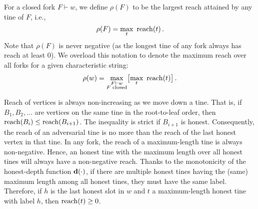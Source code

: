\begin{definition}
For a closed fork $F\vdash w$, we define $\rho(F)$ to be the largest reach attained by any tine of $F$, i.e., 
\[
\rho(F)=\underset{t}\max \ \reach(t)\,.
\]
Note that $\rho(F)$ is never negative (as the longest tine of any fork always has reach at least 0). We overload this notation to denote the maximum reach over all forks for a given characteristic string: 
\[
\rho(w)=\underset{\substack{F\vdash w\\\text{$F$ closed}}}\max\big[\underset{t}\max \ \operatorname{reach}(t)\big]\,.
\]
\end{definition}

Reach of vertices is always non-increasing as we move down a tine. 
That is, if $B_1, B_2, \ldots$ are vertices on the same tine in the root-to-leaf order, then 
$\operatorname{reach}(B_i) \leq \operatorname{reach}(B_{i+1})$. 
The inequality is strict if $B_{i + 1}$ is honest. 
Consequently, the reach of an adversarial tine is no more than 
the reach of the last honest vertex in that tine. 
In any fork, the reach of a maximum-length tine is always non-negative. 
Hence, an honest tine with the maximum length over all honest tines 
will always have a non-negative reach. 
Thanks to the monotonicity of the honest-depth function $\mathbf{d}(\cdot)$, 
if there are multiple honest tines 
having the (same) maximum length among all honest tines, 
they must have the same label. 
Therefore, if $h$ is the last honest slot in $w$ and 
$t$ a maximum-length honest tine with label $h$,  
then $\operatorname{reach}(t) \geq 0$. 




